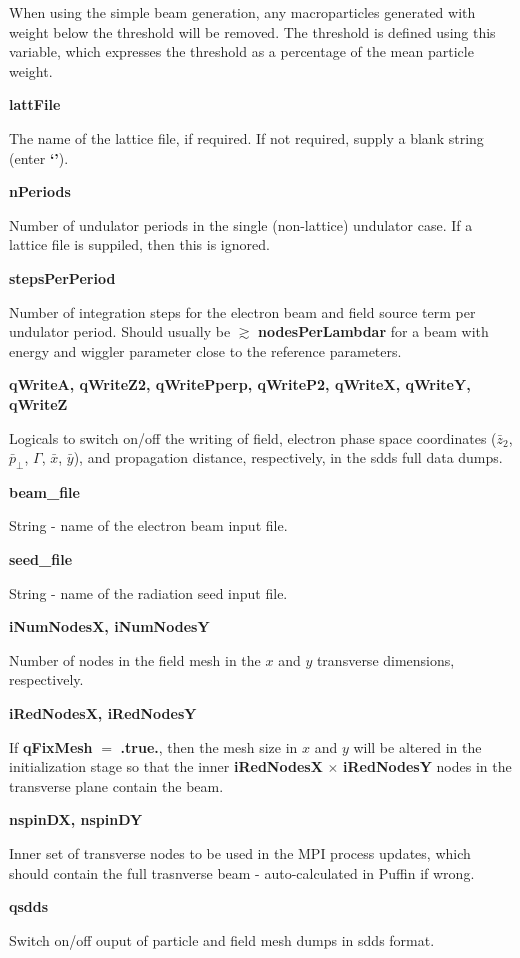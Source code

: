 \documentclass[12pt]{article}%
\begin{document}
When using the simple beam generation, any macroparticles generated with weight below the threshold will be removed. The threshold is defined using this variable, which expresses the threshold as a percentage of the mean particle weight.

{\bf lattFile}

The name of the lattice file, if required. If not required, supply a blank string (enter {\bf `'}).

{\bf nPeriods}

Number of undulator periods in the single (non-lattice) undulator case. If a lattice file is suppiled, then this is ignored.

{\bf stepsPerPeriod}

Number of integration steps for the electron beam and field source term per undulator period. Should usually be $\gtrsim$ {\bf nodesPerLambdar} for a beam with energy and wiggler parameter close to the reference parameters.

{\bf qWriteA, qWriteZ2, qWritePperp, qWriteP2, qWriteX, qWriteY, qWriteZ}

Logicals to switch on/off the writing of field, electron phase space coordinates ($\bar{z}_2$, $\bar{p}_\bot$, $\Gamma$, $\bar{x}$, $\bar{y}$), and propagation distance, respectively, in the sdds full data dumps.

{\bf beam\_file}

String - name of the electron beam input file.

{\bf seed\_file}

String - name of the radiation seed input file.

{\bf iNumNodesX, iNumNodesY}

Number of nodes in the field mesh in the $x$ and $y$ transverse dimensions, respectively.

{\bf iRedNodesX, iRedNodesY}

If {\bf qFixMesh} $=$ {\bf .true.}, then the mesh size in $x$ and $y$ will be altered in the initialization stage so that the inner {\bf iRedNodesX} $\times$ {\bf iRedNodesY} nodes in the transverse plane contain the beam.



{\bf nspinDX, nspinDY}

Inner set of transverse nodes to be used in the MPI process updates, which should contain the full trasnverse beam - auto-calculated in Puffin if wrong.

{\bf qsdds}

Switch on/off ouput of particle and field mesh dumps in sdds format.
\end{document}
